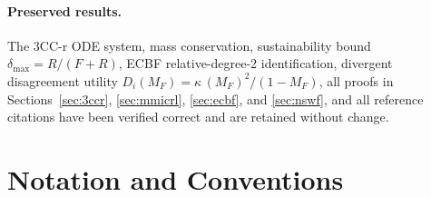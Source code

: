 \documentclass[11pt,a4paper]{article}
\begin{document}
\paragraph{Preserved results.} The 3CC-r ODE system, mass conservation,
sustainability bound $\delta_{\max} = R/(F+R)$, ECBF
relative-degree-2 identification, divergent disagreement utility
$D_i(M_F) = \kappa\,(M_F)^2/(1-M_F)$, all proofs in
Sections~\ref{sec:3ccr}, \ref{sec:mmicrl}, \ref{sec:ecbf}, and
\ref{sec:nswf}, and all reference citations have been verified
correct and are retained without change.

\section{Notation and Conventions}
\end{document}
